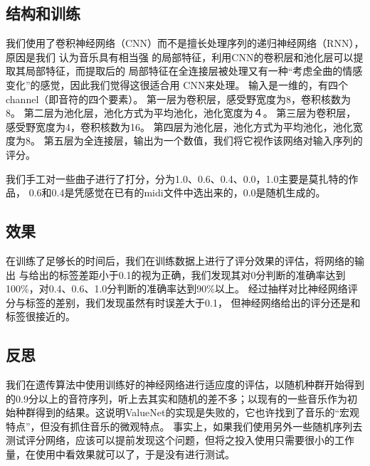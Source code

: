 \documentclass{article}
\begin{document}
  \subsection{结构和训练}
    我们使用了卷积神经网络（CNN）而不是擅长处理序列的递归神经网络（RNN），原因是我们
    认为音乐具有相当强
    的局部特征，利用CNN的卷积层和池化层可以提取其局部特征，而提取后的
    局部特征在全连接层被处理又有一种“考虑全曲的情感变化”的感觉，因此我们觉得这很适合用
    CNN来处理。
    输入是一维的，有四个channel（即音符的四个要素）。
    第一层为卷积层，感受野宽度为8，卷积核数为8。
    第二层为池化层，池化方式为平均池化，池化宽度为４。
    第三层为卷积层，感受野宽度为4，卷积核数为16。
    第四层为池化层，池化方式为平均池化，池化宽度为8。
    第五层为全连接层，输出为一个数值，我们将它视作该网络对输入序列的评分。

    我们手工对一些曲子进行了打分，分为1.0、0.6、0.4、0.0，1.0主要是莫扎特的作品，
    0.6和0.4是凭感觉在已有的midi文件中选出来的，0.0是随机生成的。
  \subsection{效果}
    在训练了足够长的时间后，我们在训练数据上进行了评分效果的评估，将网络的输出
    与给出的标签差距小于0.1的视为正确，我们发现其对0分判断的准确率达到100\%，对0.4、0.6、1.0分判断的准确率达到90\%以上。
    经过抽样对比神经网络评分与标签的差别，我们发现虽然有时误差大于0.1，
    但神经网络给出的评分还是和标签很接近的。
  \subsection{反思}
    我们在遗传算法中使用训练好的神经网络进行适应度的评估，以随机种群开始得到的0.9分以上的音符序列，听上去其实和随机的差不多；以现有的一些音乐作为初始种群得到的结果。这说明ValueNet的实现是失败的，它也许找到了音乐的“宏观特点”，但没有抓住音乐的微观特点。
    事实上，如果我们使用另外一些随机序列去测试评分网络，应该可以提前发现这个问题，但将之投入使用只需要很小的工作量，在使用中看效果就可以了，于是没有进行测试。
\end{document}
